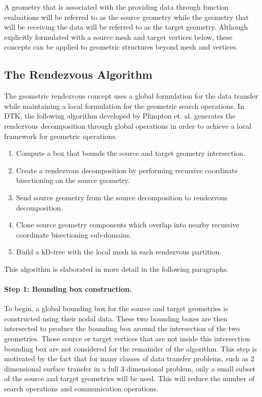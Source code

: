 \documentclass[letterpaper,12pt]{article}
\begin{document}
A geometry that is associated with the providing data through function
evaluations will be referred to as the source geometry while the
geometry that will be receiving the data will be referred to as the
target geometry. Although explicitly formulated with a source mesh and
target vertices below, these concepts can be applied to geometric
structures beyond mesh and vertices.

\subsection{The Rendezvous Algorithm}\label{subsec:rendezvous_alg}
The geometric rendezvous concept uses a global formulation for the
data transfer while maintaining a local formulation for the geometric
search operations. In DTK, the following algorithm developed by
Plimpton et. al. \cite{Plimpton_2004} generates the rendezvous
decomposition through global operations in order to achieve a local
framework for geometric operations.

\begin{enumerate}
\item Compute a box that bounds the source and target geometry
  intersection.
\item Create a rendezvous decomposition by performing recursive
  coordinate bisectioning on the source geometry.
\item Send source geometry from the source decomposition to rendezvous
  decomposition.
\item Clone source geometry components which overlap into nearby
  recursive coordinate bisectioning sub-domains.
\item Build a kD-tree with the local mesh in each rendezvous
  partition.
\end{enumerate}

This algorithm is elaborated in more detail in the following
paragraphs.

\paragraph{Step 1: Bounding box construction.}
To begin, a global bounding box for the source and target geometries
is constructed using their nodal data. These two bounding boxes are
then intersected to produce the bounding box around the intersection
of the two geometries. Those source or target vertices that are not
inside this intersection bounding box are not considered for the
remainder of the algorithm. This step is motivated by the fact that
for many classes of data transfer problems, such as 2 dimensional
surface transfer in a full 3 dimensional problem, only a small subset
of the source and target geometries will be used. This will reduce the
number of search operations and communication operations.
\end{document}

